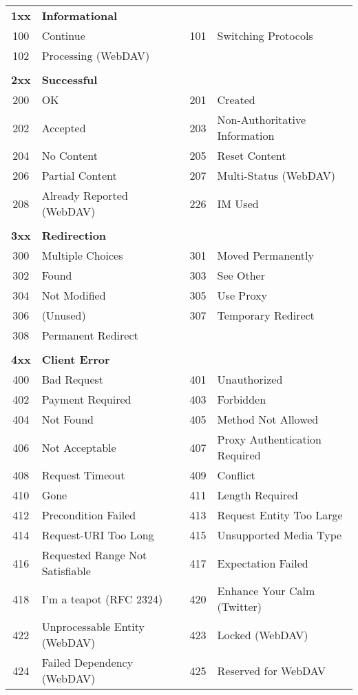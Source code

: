 \begin{longtable}[\textwidth]{|c|l|c|l|}
	\textbf{1xx} & \textbf{Informational} & & \\
	100 & Continue & 101 & Switching Protocols \\
	102 & Processing (WebDAV) & & \\
	& & & \\
	\textbf{2xx} & \textbf{Successful} & & \\
	200 & OK & 201 & Created \\
	202 & Accepted & 203 & Non-Authoritative Information \\
	204 & No Content & 205 & Reset Content \\
	206 & Partial Content & 207 & Multi-Status (WebDAV) \\
	208 & Already Reported (WebDAV) & 226 & IM Used \\
	& & & \\
	\textbf{3xx} & \textbf{Redirection} & & \\
	300 & Multiple Choices & 301 & Moved Permanently \\
	302 & Found & 303 & See Other \\
	304 & Not Modified & 305 & Use Proxy \\
	306 & (Unused) & 307 & Temporary Redirect \\
	308 & Permanent Redirect & & \\
	& & & \\
	\textbf{4xx} & \textbf{Client Error} & & \\
	400 & Bad Request & 401 & Unauthorized \\
	402 & Payment Required & 403 & Forbidden \\
	404 & Not Found & 405 & Method Not Allowed \\
	406 & Not Acceptable & 407 & Proxy Authentication Required \\
	408 & Request Timeout & 409 & Conflict \\
	410 & Gone & 411 & Length Required \\
	412 & Precondition Failed & 413 & Request Entity Too Large \\
	414 & Request-URI Too Long & 415 & Unsupported Media Type \\
	416 & Requested Range Not Satisfiable & 417 & Expectation Failed \\
	418 & I'm a teapot (RFC 2324) & 420 & Enhance Your Calm (Twitter) \\
	422 & Unprocessable Entity (WebDAV) & 423 & Locked (WebDAV) \\
	424 & Failed Dependency (WebDAV) & 425 & Reserved for WebDAV \\

\end{longtable}
